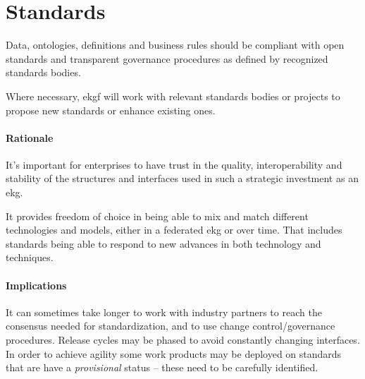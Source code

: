 \section{Standards}\label{ekg-principle-standards}

Data, ontologies, definitions and business rules should be compliant with open
standards and transparent governance procedures as defined by recognized standards
bodies.

Where necessary, \gls{ekgf} will work with relevant standards bodies or projects 
to propose new standards or enhance existing ones.

\paragraph{Rationale}

It's important for enterprises to have trust in the quality, 
interoperability and stability of the structures and interfaces 
used in such a strategic investment as an \gls{ekg}.

It provides freedom of choice in being able to mix and match different 
technologies and models, either in a federated \gls{ekg} or over time. 
That includes standards being able to respond to new advances in both 
technology and techniques. 

\paragraph{Implications}

It can sometimes take longer to work with industry partners to reach the 
consensus needed for standardization, and to use change control/governance procedures.
Release cycles may be phased to avoid constantly changing interfaces.
In order to achieve agility some work products may be deployed on standards 
that are have a \textit{provisional} status -- these need to be carefully identified.
